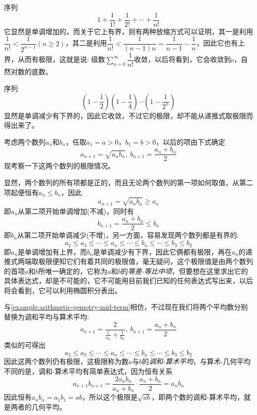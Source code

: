 \begin{example}
  序列
  \[ 1+\frac{1}{1!} + \frac{1}{2!} + \cdots + \frac{1}{n!} \]
  它显然是单调增加的，而关于它上有界，则有两种放缩方式可以证明，其一是利用$\dfrac{1}{n!}<\dfrac{1}{2^{n-1}}(n \geqslant 2)$，其二是利用$\dfrac{1}{n!}<\dfrac{1}{(n-1)n}=\dfrac{1}{n-1}-\dfrac{1}{n}$，因此它也有上界，从而有极限，这就是说: 级数$\sum\limits_{n=0}^{\infty} \dfrac{1}{n!}$收敛，以后将看到，它会收敛到$\mathrm{e}$，自然对数的底数。
\end{example}

\begin{example}
  序列
  \[ \left( 1-\frac{1}{2} \right) \left( 1-\frac{1}{4} \right) \cdots \left( 1-\frac{1}{2^n} \right) \]
  显然是单调减少有下界的，因此它收敛，不过它的极限，却不能从递推式取极限而得出来了。
\end{example}

\begin{example}[等差-等比中项]
  \label{example:arithmetic-gemotry-mid-term}
  考虑两个数列$a_n$和$b_n$，任取$a_1=a>0$，$b_1=b>0$，以后的项由下式确定
  \[ a_{n+1} = \sqrt{a_nb_n}, \  b_{n+1}=\frac{a_n+b_n}{2} \]
  现考察一下这两个数列的极限情况。

  显然，两个数列的所有项都是正的，而且无论两个数列的第一项如何取值，从第二项起便恒有$a_n \leqslant b_n$，因此
  \[ a_{n+1} = \sqrt{a_nb_n} \geqslant a_n \]
  即$a_n$从第二项开始单调增加(不减)，同时有
  \[ b_{n+1} = \frac{a_n+b_n}{2} \leqslant b_n \]
  即$b_n$从第二项开始单调减少(不增)，另一方面，容易发现两个数列都是有界的:
  \[ a_2 \leqslant a_3 \leqslant \cdots \leqslant a_n \leqslant \cdots \leqslant b_n \leqslant \cdots \leqslant b_3 \leqslant b_2  \]
  即$a_n$是单调增加有上界，而$b_n$是单调减少有下界，因此它俩都有极限，再在$a_n$的递推式两端取极限便知它们有着共同的极限值，毫无疑问，这个极限值是由两个数列的首项$a$和$b$所唯一确定的，它称为$a$和$b$的\emph{等差-等比中项}，但要想在这里求出它的具体表达式，却是不可能的，它不可能用目前我们已知的任何表达式写出来，以后将会看到，它可以利用椭圆积分表出。
\end{example}

\begin{example}[调和-算术中项]
  \label{example:harmonic-arithmetic-mid-term}
  与\autoref{example:arithmetic-gemotry-mid-term}相仿，不过现在我们将两个平均数分别替换为调和平均与算术平均:
  \[ a_{n+1} = \frac{2}{\frac{1}{a_n}+\frac{1}{b_n}}, \  b_{n+1} = \frac{a_n+b_n}{2} \]
  类似的可得出
  \[ a_2 \leqslant a_3 \leqslant \cdots \leqslant a_n \leqslant \cdots \leqslant b_n \leqslant \cdots \leqslant b_3 \leqslant b_2  \]
  因此这两个数列仍有极限，这极限称为数$a$与$b$的\emph{调和-算术平均}，与算术-几何平均不同的是，调和-算术平均有简单表达式，因为恒有关系
  \[ a_{n+1}b_{n+1} = \frac{2a_nb_n}{a_n+b_n} \cdot \frac{a_n+b_n}{2} = a_nb_n \]
  因此恒有$a_nb_n=a_1b_1=ab$，所以这个极限是$\sqrt{ab}$，即两个数的调和-算术平均，就是两者的几何平均。
\end{example}


